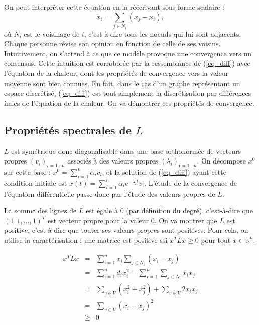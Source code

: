 \documentclass[12pt]{article}
\newcommand{\R}{\mathbb{R}}
\begin{document}
On peut interpréter cette équation en la réécrivant sous forme scalaire :
\begin{equation}
  \label{eq_diff_scal}
  \dot {x}_i = \sum_{j \in N_i} (x_j - x_i),
\end{equation}
où $N_i$ est le voisinage de $i$, c'est à dire tous les noeuds qui lui
sont adjacents. Chaque personne révise son opinion en fonction de
celle de ses voisins. Intuitivement, on s'attend à ce que ce modèle
provoque une convergence vers un consensus. Cette intuition est
corroborée par la ressemblance de (\ref{eq_diff}) avec l'équation de
la chaleur, dont les propriétés de convergence vers la valeur moyenne
sont bien connues. En fait, dans le cas d'un graphe représentant un
espace discrétisé, (\ref{eq_diff}) est tout simplement la
discrétisation par différences finies de l'équation de la chaleur. On
va démontrer ces propriétés de convergence.

\subsection{Propriétés spectrales de $L$}
$L$ est symétrique donc diagonalisable dans une base orthonormée de
vecteurs propres $(v_i)_{i=1\dots n}$ associés à des valeurs propres
$(\lambda_i)_{i=1 \dots n}$. On décompose $x^0$ sur cette base : $x^0
= \sum_{i=1}^n \alpha_i v_i$, et la solution de (\ref{eq_diff}) ayant
cette condition initiale est $x(t) = \sum_{i=1}^n \alpha_i e^{-
  \lambda_i t} v_i$. L'étude de la convergence de l'équation
différentielle passe donc par l'étude des valeurs propres de $L$.

La somme des lignes de $L$ est égale à $0$ (par définition du degré),
c'est-à-dire que $(1, 1, \dots, 1)^T$ est vecteur propre pour la valeur
$0$. On va montrer que $L$ est positive, c'est-à-dire que toutes ses
valeurs propres sont positives. Pour cela, on utilise la
caractérisation : une matrice est positive ssi $x^T L x \geq 0$ pour
tout $x \in \R^n$.

\begin{eqnarray*}
  x^T L x & = & \sum_{i = 1}^n x_i \sum_{j \in N_i} (x_i - x_j) \\
          & = & \sum_{i = 1}^n d_i x_i^2 - \sum_{i = 1}^n \sum_{j \in N_i} x_i x_j \\
          & = & \sum_{v \in V} (x_i^2 + x_j^2) + \sum_{v \in V} 2 x_i x_j \\
          & = & \sum_{v \in V} (x_i - x_j)^2 \\
          & \geq & 0
\end{eqnarray*}
\end{document}
